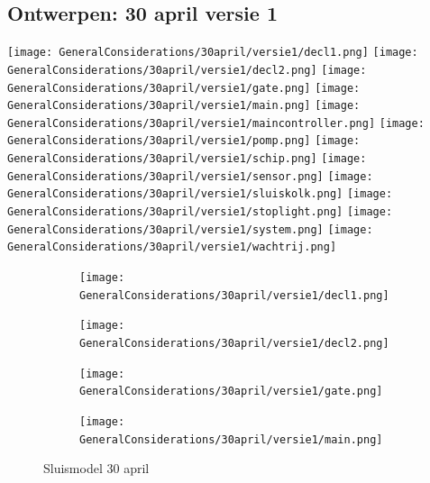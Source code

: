 \documentclass{article}
\begin{document}
	\subsection{Ontwerpen: 30 april versie 1}
	
	\texttt{[image: GeneralConsiderations/30april/versie1/decl1.png]}
	\texttt{[image: GeneralConsiderations/30april/versie1/decl2.png]}
	\texttt{[image: GeneralConsiderations/30april/versie1/gate.png]}
	\texttt{[image: GeneralConsiderations/30april/versie1/main.png]}
	\texttt{[image: GeneralConsiderations/30april/versie1/maincontroller.png]}
	\texttt{[image: GeneralConsiderations/30april/versie1/pomp.png]}
	\texttt{[image: GeneralConsiderations/30april/versie1/schip.png]}
	\texttt{[image: GeneralConsiderations/30april/versie1/sensor.png]}
	\texttt{[image: GeneralConsiderations/30april/versie1/sluiskolk.png]}
	\texttt{[image: GeneralConsiderations/30april/versie1/stoplight.png]}
	\texttt{[image: GeneralConsiderations/30april/versie1/system.png]}
	\texttt{[image: GeneralConsiderations/30april/versie1/wachtrij.png]}
	
	
	
	
	
	\begin{figure}
		\centering
		\begin{subfigure}{0.45\linewidth}
			\texttt{[image: GeneralConsiderations/30april/versie1/decl1.png]}
			\caption{}
			\label{fig:1a}
		\end{subfigure}\hfill
		\begin{subfigure}{0.45\linewidth}
			\texttt{[image: GeneralConsiderations/30april/versie1/decl2.png]}
			\caption{}
			\label{fig:1a}
		\end{subfigure}
		
		\begin{subfigure}{0.45\linewidth}
			\texttt{[image: GeneralConsiderations/30april/versie1/gate.png]}
			\caption{}
			\label{fig:1a}
		\end{subfigure}\hfill
		\begin{subfigure}{0.45\linewidth}
			\texttt{[image: GeneralConsiderations/30april/versie1/main.png]}
			\caption{}
			\label{fig:1a}
		\end{subfigure}
		\caption{Sluismodel 30 april}
		\label{fig:1}
	\end{figure}
	
\end{document}
